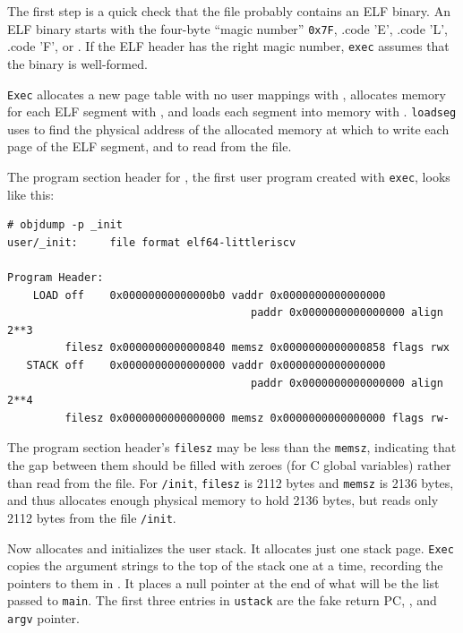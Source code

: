 The first step is a quick check that the file probably contains an
ELF binary.
An ELF binary starts with the four-byte ``magic number''
\lstinline{0x7F},
.code 'E',
.code 'L',
.code 'F',
or
.
If the ELF header has the right magic number,
\lstinline{exec}
assumes that the binary is well-formed.

\lstinline{Exec}
allocates a new page table with no user mappings with
,
allocates memory for each ELF segment with
,
and loads each segment into memory with
.
\lstinline{loadseg}
uses
to find the physical address of the allocated memory at which to write
each page of the ELF segment, and
to read from the file.

The program section header for
,
the first user program created with
\lstinline{exec},
looks like this:
\begin{footnotesize}
\begin{verbatim}
# objdump -p _init
user/_init:     file format elf64-littleriscv

Program Header:
    LOAD off    0x00000000000000b0 vaddr 0x0000000000000000 
                                      paddr 0x0000000000000000 align 2**3
         filesz 0x0000000000000840 memsz 0x0000000000000858 flags rwx
   STACK off    0x0000000000000000 vaddr 0x0000000000000000 
                                      paddr 0x0000000000000000 align 2**4
         filesz 0x0000000000000000 memsz 0x0000000000000000 flags rw-
\end{verbatim}
\end{footnotesize}

The program section header's
\lstinline{filesz}
may be less than the
\lstinline{memsz},
indicating that the gap between them should be filled
with zeroes (for C global variables) rather than read from the file.
For
\lstinline{/init},
\lstinline{filesz}
is 2112 bytes and
\lstinline{memsz}
is 2136 bytes,
and thus
allocates enough physical memory to hold 2136 bytes, but reads only 2112 bytes
from the file
\lstinline{/init}.

Now
allocates and initializes the user stack.
It allocates just one stack page.
\lstinline{Exec}
copies the argument strings to the top of the stack
one at a time, recording the pointers to them in
.
It places a null pointer at the end of what will be the
list passed to
\lstinline{main}.
The first three entries in
\lstinline{ustack}
are the fake return PC,
,
and
\lstinline{argv}
pointer.

